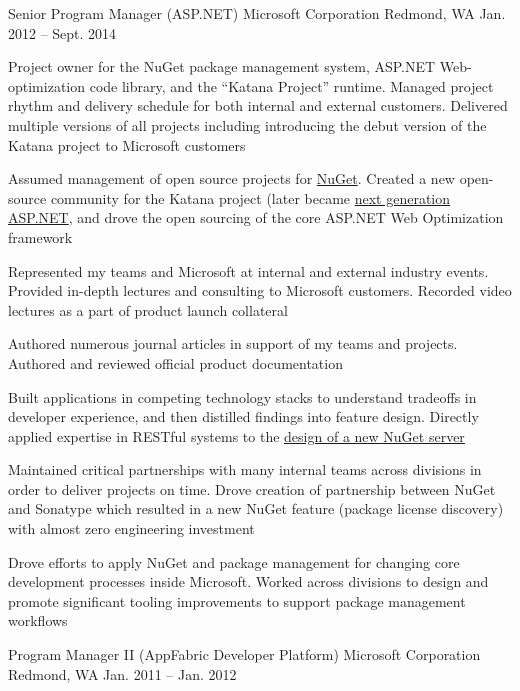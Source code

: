 \begin{cventries}
\cventry 
{Senior Program Manager (ASP.NET)}
{Microsoft Corporation}
{Redmond, WA}
{Jan. 2012 – Sept. 2014}
{
  \begin{cvitems}
  \item {Project owner for the NuGet package management system, ASP.NET Web-optimization code library, and the “Katana Project” runtime. Managed project rhythm and delivery schedule for both internal and external customers. Delivered multiple versions of all projects including introducing the debut version of the Katana project to Microsoft customers}
  \item {Assumed management of open source projects for \href{https://github.com/NuGet}{NuGet}. Created a new open-source community for the Katana project (later became \href{https://github.com/aspnet/GetStarted}{next generation ASP.NET}, and drove the open sourcing of the core ASP.NET Web Optimization framework}
  \item {Represented my teams and Microsoft at internal and external industry events. Provided in-depth lectures and consulting to Microsoft customers. Recorded video lectures as a part of product launch collateral}
  \item {Authored numerous journal articles in support of my teams and projects. Authored and reviewed official product documentation}
  \item {Built applications in competing technology stacks to understand tradeoffs in developer experience, and then distilled findings into feature design. Directly applied expertise in RESTful systems to the \href{https://docs.nuget.org/ndocs/api/nuget-api-v3}{design of a new NuGet server}}
  \item {Maintained critical partnerships with many internal teams across divisions in order to deliver projects on time. Drove creation of partnership between NuGet and Sonatype which resulted in a new NuGet feature (package license discovery) with almost zero engineering investment}
  \item {Drove efforts to apply NuGet and package management for changing core development processes inside Microsoft. Worked across divisions to design and promote significant tooling improvements to support package management workflows}
  \end{cvitems}
}


\cventry 
{Program Manager II (AppFabric Developer Platform)}
{Microsoft Corporation}
{Redmond, WA}
{Jan. 2011 – Jan. 2012}
{}


\end{cventries}

